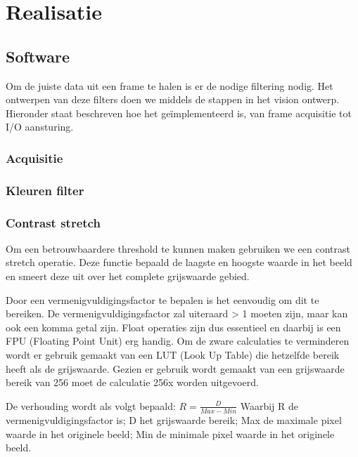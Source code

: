 \chapter{Realisatie}


\section{Software}
\label{sec:softreal}
Om de juiste data uit een frame te halen is er de nodige filtering nodig.
Het ontwerpen van deze filters doen we middels de stappen in het vision ontwerp.
Hieronder staat beschreven hoe het geïmplementeerd is, van frame acquisitie tot
I/O aansturing.

\subsection{Acquisitie}
\label{sub:acqreal}

\subsection{Kleuren filter}
\label{sub:kleurfilt}

\subsection{Contrast stretch}
\label{sub:contstr}
Om een betrouwbaardere threshold te kunnen maken gebruiken we een contrast stretch
operatie. Deze functie bepaald de laagste en hoogste waarde in het beeld en smeert
deze uit over het complete grijswaarde gebied.

Door een vermenigvuldigingsfactor te bepalen is het eenvoudig om dit te bereiken. De vermenigvuldigingsfactor zal uiteraard > 1 moeten zijn, maar kan ook een komma getal
zijn. Float operaties zijn dus essentieel en daarbij is een FPU (Floating Point Unit)
erg handig. Om de zware calculaties te verminderen wordt er gebruik gemaakt van een
LUT (Look Up Table) die hetzelfde bereik heeft als de grijswaarde. Gezien er gebruik
wordt gemaakt van een grijswaarde bereik van 256 moet de calculatie 256x worden
uitgevoerd.

De verhouding wordt als volgt bepaald:
$R = \frac{D}{Max - Min}$
Waarbij R de vermenigvuldigingsfactor is;
D het grijswaarde bereik;
Max de maximale pixel waarde in het originele beeld;
Min de minimale pixel waarde in het originele beeld.

